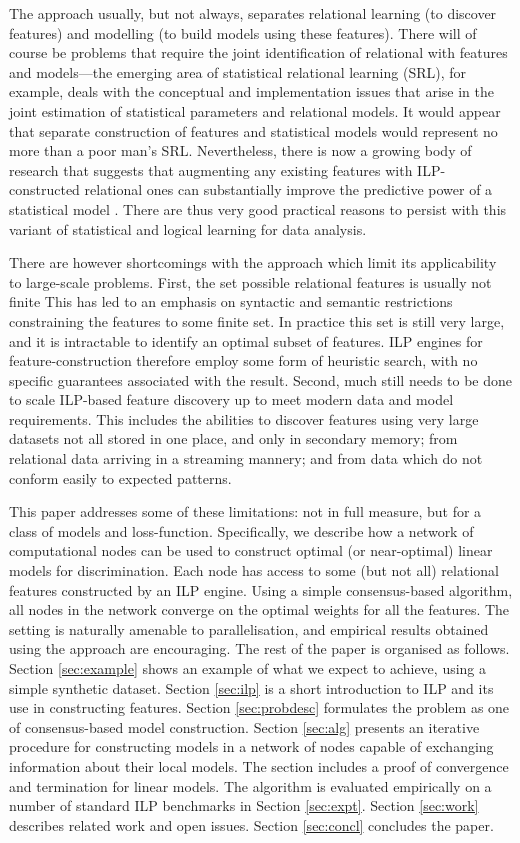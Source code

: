The approach usually, but not always, separates relational learning
(to discover features) and modelling
(to build models using these features). There will of course
be problems that require the joint identification of relational
 with features and models---the emerging area of statistical relational
learning (SRL), for example, deals with the conceptual and implementation issues
that arise in the joint estimation of statistical parameters and relational
models. It would appear that separate construction of features
and statistical models would represent no more than a poor man's SRL.
Nevertheless, there is now a growing body of
research that suggests that augmenting any existing
features with ILP-constructed relational ones can substantially
improve the predictive power of a statistical model \cite{something}.
There are thus  very good practical reasons to persist with this variant of
statistical and logical learning for data analysis.

There are however shortcomings with the approach which limit its
applicability to large-scale problems. First, the set possible relational features
is usually not finite This has led to an emphasis on syntactic and
semantic restrictions constraining the features to some finite set. In practice
this set is still very large, and it is intractable to identify an optimal
subset of features. ILP engines for feature-construction therefore employ some form
of heuristic search, with no specific guarantees associated with the result.
Second, much still needs to be done to scale ILP-based feature discovery
up to meet modern data and model requirements. This includes the abilities to
discover features using very large datasets not all stored in one place,
and only in secondary memory; from relational data arriving in a streaming mannery;
and from data which do not conform easily to expected patterns.

This paper addresses some of these limitations: not in full measure, but for a class
of models and loss-function. Specifically, we describe how a network of computational
nodes can be used to construct optimal (or near-optimal) linear models for discrimination.
Each node has access to some (but not all) relational features constructed by an ILP
engine. Using a simple consensus-based algorithm, all nodes in the network converge on
the optimal weights for all the features. The setting is naturally amenable to
parallelisation, and empirical results obtained using the approach are encouraging.
The rest of the paper is organised as follows. Section \ref{sec:example}
shows an example of what we expect to achieve, using a simple synthetic
dataset. Section \ref{sec:ilp} is a short
introduction to ILP and its use in constructing features. Section \ref{sec:probdesc}
formulates the problem as one of consensus-based model construction. Section \ref{sec:alg}
presents an iterative procedure for constructing models in a network of nodes capable
of exchanging information about their local models. The section includes a proof of
convergence and termination for linear models. The algorithm is evaluated empirically
on a number of standard ILP benchmarks in Section \ref{sec:expt}. Section
\ref{sec:work} describes related work and open issues. Section \ref{sec:concl}
concludes the paper.

